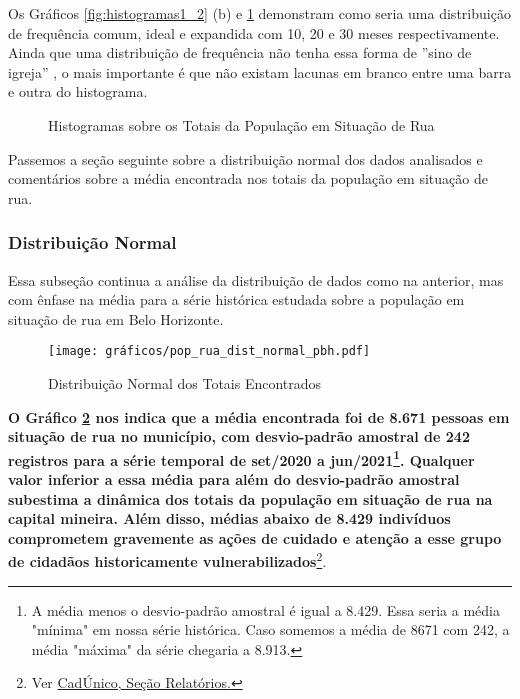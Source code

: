 \documentclass[12pt]{article}
\begin{document}
Os Gráficos \ref{fig:histogramas1_2} (b) e \ref{fig:histogramas3_4} demonstram como seria uma distribuição de frequência comum, ideal e expandida com 10, 20 e 30 meses respectivamente. Ainda que uma distribuição de frequência não tenha essa forma de ”sino de igreja” , o mais importante é que não existam lacunas em branco entre uma barra e outra do histograma.\\

\begin{figure}[H]
	\caption{Histogramas sobre os Totais da População em Situação de Rua}
	\qquad
	\label{fig:histogramas3_4}
\end{figure}

Passemos a seção seguinte sobre a distribuição normal dos dados analisados e comentários sobre a média encontrada nos totais da população em situação de rua.


\subsubsection{Distribuição Normal}
\label{distri_normal}

Essa subseção continua a análise da distribuição de dados como na anterior, mas com ênfase na média para a série histórica estudada sobre a população em situação de rua em Belo Horizonte.\\

\begin{figure}[H]
\centering
	\caption{Distribuição Normal dos Totais Encontrados}
	\texttt{[image: gráficos/pop\_rua\_dist\_normal\_pbh.pdf]}
	\label{fig:pop_rua_dist_normal}
\end{figure}

\textbf{O Gráfico \ref{fig:pop_rua_dist_normal} nos indica que a média encontrada foi de 8.671 pessoas em situação de rua no município, com desvio-padrão amostral de 242 registros para a série temporal de set/2020 a jun/2021\footnote{A média menos o desvio-padrão amostral é igual a 8.429. Essa seria a média "mínima" em nossa série histórica. Caso somemos a média de 8671 com 242, a média "máxima" da série chegaria a 8.913.}. Qualquer valor inferior a essa média para além do desvio-padrão amostral subestima a dinâmica dos totais da população em situação de rua na capital mineira. Além disso, médias abaixo de 8.429 indivíduos comprometem gravemente as ações de cuidado e atenção a esse grupo de cidadãos historicamente vulnerabilizados}\footnote{Ver \href{https://aplicacoes.mds.gov.br/sagirmps/bolsafamilia/relatorio-completo.html}{CadÚnico, Seção Relatórios.}}.\\
\end{document}
